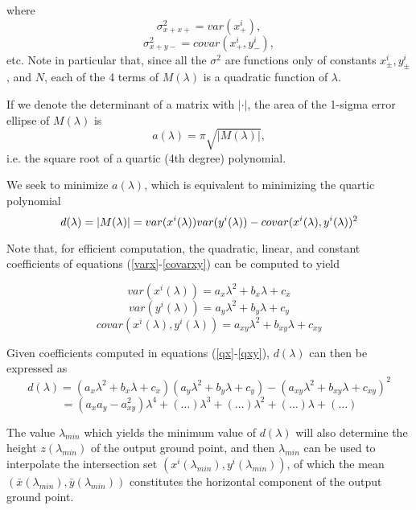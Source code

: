 \documentclass{amsart}
\begin{document}
where
$$\sigma^2_{x+x+}=var(x^i_+),$$
$$\sigma^2_{x+y-}=covar(x^i_+, y^i_-),$$
etc. Note in particular that, since all the $\sigma^2$ are functions only of constants $x^i_\pm, y^i_\pm$, and $N$, each of the 4 terms of $M(\lambda)$ is a quadratic function of $\lambda$.

If we denote the determinant of a matrix with $|\cdot|$, the area of the
1-sigma error ellipse of $M(\lambda)$ is
$$a(\lambda) = \pi\sqrt{|M(\lambda)|},$$
i.e. the square root of a quartic (4th degree) polynomial.

We seek to minimize $a(\lambda)$, which is equivalent to minimizing
the quartic polynomial 
\begin{equation*}
d(\lambda) = |M(\lambda)| \\
           = var(x^i(\lambda))var(y^i(\lambda)) - covar(x^i(\lambda),y^i(\lambda))^2
\end{equation*}

Note that, for efficient computation, the quadratic, linear, and
constant coefficients of equations (\ref{varx}-\ref{covarxy}) can be
computed to yield

\begin{equation}\label{qx}
var(x^i(\lambda)) = a_x\lambda^2 + b_x\lambda + c_x
\end{equation}
\begin{equation}\label{qy}
var(y^i(\lambda)) = a_y\lambda^2 + b_y\lambda + c_y
\end{equation}
\begin{equation}\label{qxy}
covar(x^i(\lambda),y^i(\lambda)) = a_{xy}\lambda^2 + b_{xy}\lambda + c_{xy}
\end{equation}

Given coefficients computed in equations (\ref{qx}-\ref{qxy}),
$d(\lambda)$ can then be expressed as
\begin{equation*}\label{d}
d(\lambda) = (a_x\lambda^2 + b_x\lambda + c_x)(a_y\lambda^2 + b_y\lambda + c_y) - 
(a_{xy}\lambda^2 + b_{xy}\lambda + c_{xy})^2
\end{equation*}
\begin{equation}
= (a_xa_y-a_{xy}^2)\lambda^4 + (\ldots)\lambda^3 + (\ldots)\lambda^2 + (\ldots)\lambda + (\ldots)
\end{equation}

The value $\lambda_{min}$ which yields the minimum value of
$d(\lambda)$ will also determine the height $z(\lambda_{min})$ of the
output ground point, and then $\lambda_{min}$ can be used to
interpolate the intersection set
$(x^i(\lambda_{min}),y^i(\lambda_{min}))$, of which the mean
$(\bar{x}(\lambda_{min}),\bar{y}(\lambda_{min}))$ constitutes the
horizontal component of the output ground point.
\end{document}
